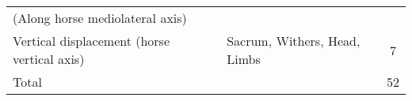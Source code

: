 \begin{table}[!htbp]
{\begin{tabular}{llc}
\multicolumn{1}{l}{(Along horse mediolateral axis)} & &  \\[0.4 em]

\multicolumn{1}{l}{Vertical displacement (horse vertical axis)} & \multicolumn{1}{l}{Sacrum, Withers, Head, Limbs} & 7 \\[0.1 em]


\midrule

\multicolumn{1}{l}{Total} & & 52  \\[0.1 em]

\bottomrule
\end{tabular}}
        
    \label{deff}

    \end{table}
    